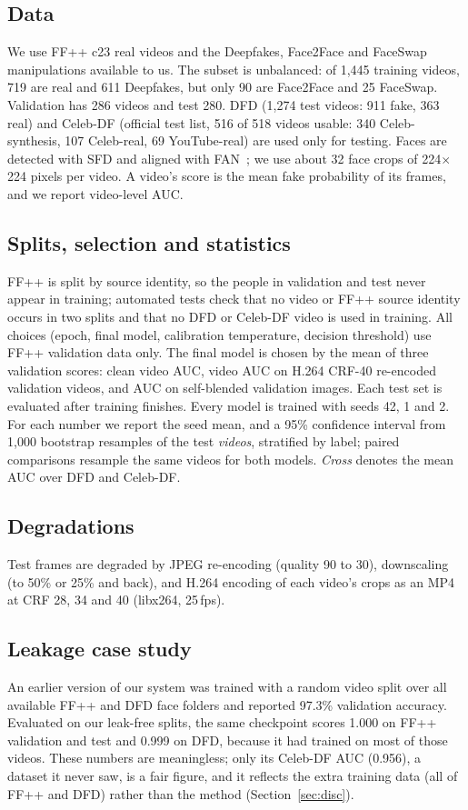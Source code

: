 \documentclass[conference]{IEEEtran}
\begin{document}
\subsection{Data}\label{sec:data}
We use FF++ c23 real videos and the Deepfakes, Face2Face and FaceSwap manipulations available to us. The subset is
unbalanced: of 1,445 training videos, 719 are real and 611 Deepfakes, but only 90 are Face2Face and 25 FaceSwap.
Validation has 286 videos and test 280. DFD (1,274 test videos: 911 fake, 363 real) and Celeb-DF (official test
list, 516 of 518 videos usable: 340 Celeb-synthesis, 107 Celeb-real, 69 YouTube-real) are used only for testing.
Faces are detected with SFD and aligned with FAN~\cite{fan}; we use about 32 face crops of 224$\times$224 pixels per
video. A video's score is the mean fake probability of its frames, and we report video-level AUC.

\subsection{Splits, selection and statistics}
FF++ is split by source identity, so the people in validation and test never appear in training; automated tests
check that no video or FF++ source identity occurs in two splits and that no DFD or Celeb-DF video is used in
training. All choices (epoch, final model,
calibration temperature, decision threshold) use FF++ validation data only. The final model is chosen by the mean
of three validation scores: clean video AUC, video AUC on H.264 CRF-40 re-encoded validation videos, and AUC on
self-blended validation images. Each test set is evaluated after training finishes. Every model is trained with
seeds 42, 1 and 2. For each number we report the seed mean, and a 95\% confidence interval from 1,000 bootstrap
resamples of the test \emph{videos}, stratified by label; paired comparisons resample the same videos for both
models. \emph{Cross} denotes the mean AUC over DFD and Celeb-DF.

\subsection{Degradations}
Test frames are degraded by JPEG re-encoding (quality 90 to 30), downscaling (to 50\% or 25\% and back), and
H.264 encoding of each video's crops as an MP4 at CRF 28, 34 and 40 (libx264, 25\,fps).

\subsection{Leakage case study}\label{sec:leak}
An earlier version of our system was trained with a random video split over all available FF++ and DFD face
folders and reported 97.3\% validation accuracy. Evaluated on our leak-free splits, the same checkpoint scores
1.000 on FF++ validation and test and 0.999 on DFD, because it had trained on most of those videos. These numbers
are meaningless; only its Celeb-DF AUC (0.956), a dataset it never saw, is a fair figure, and it reflects the extra
training data (all of FF++ and DFD) rather than the method (Section~\ref{sec:disc}).
\end{document}
